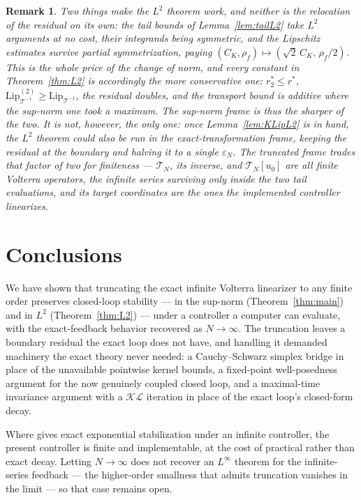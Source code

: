 \documentclass[10pt,a4paper]{amsart}
\newtheorem{remark}{Remark}
\newcommand{\Tcal}{\mathcal{T}}
\newcommand{\Linf}{L^\infty}
\newcommand{\Ltwo}{L^2}
\newcommand{\LipT}{\mathrm{Lip}_{\Tcal^{-1}}}
\newcommand{\eps}{\varepsilon}
\begin{document}
\begin{remark}\label{rem:L2frames}
Two things make the $\Ltwo$ theorem work, and neither is the relocation of the residual on its own: the tail bounds of Lemma~\ref{lem:tailL2} take $\Ltwo$ arguments at no cost, their integrands being symmetric, and the Lipschitz estimates survive partial symmetrization, paying $(C_K, \rho_f) \mapsto (\sqrt{2}\,C_K,\, \rho_f/2)$. This is the whole price of the change of norm, and every constant in Theorem~\ref{thm:L2} is accordingly the more conservative one: $r_2^* \le r^*$, $\LipT^{(2)} \ge \LipT$, the residual doubles, and the transport bound is additive where the sup-norm one took a maximum. The sup-norm frame is thus the sharper of the two. It is not, however, the only one: once Lemma~\ref{lem:KLipL2} is in hand, the $\Ltwo$ theorem could also be run in the exact-transformation frame, keeping the residual at the boundary and halving it to a single $\eps_N$. The truncated frame trades that factor of two for finiteness --- $\Tcal_N$, its inverse, and $\Tcal_N[u_0]$ are all finite Volterra operators, the infinite series surviving only inside the two tail evaluations, and its target coordinates are the ones the implemented controller linearizes.
\end{remark}

\section{Conclusions}\label{sec:conclusions}

We have shown that truncating the exact infinite Volterra linearizer to any finite order preserves closed-loop stability --- in the sup-norm (Theorem~\ref{thm:main}) and in $\Ltwo$ (Theorem~\ref{thm:L2}) --- under a controller a computer can evaluate, with the exact-feedback behavior recovered as $N \to \infty$. The truncation leaves a boundary residual the exact loop does not have, and handling it demanded machinery the exact theory never needed: a Cauchy--Schwarz simplex bridge in place of the unavailable pointwise kernel bounds, a fixed-point well-posedness argument for the now genuinely coupled closed loop, and a maximal-time invariance argument with a $\mathcal{KL}$ iteration in place of the exact loop's closed-form decay.

Where \cite{krstic2026feedbacklinearizationhyperbolicpdes} gives exact exponential stabilization under an infinite controller, the present controller is finite and implementable, at the cost of practical rather than exact decay. Letting $N \to \infty$ does not recover an $\Linf$ theorem for the infinite-series feedback --- the higher-order smallness that admits truncation vanishes in the limit --- so that case remains open.
\end{document}
